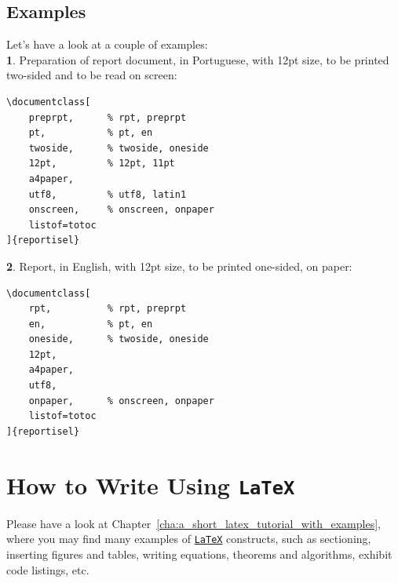 \subsection{Examples}
\label{ssec:examples}

Let's have a look at a couple of examples:\\

\textbf{1}. Preparation of report document, in Portuguese, with 12pt size, to be printed two-sided and to be read on screen:
\begin{lstlisting}[language=myLaTeX]
\documentclass[
    preprpt,      % rpt, preprpt
    pt,           % pt, en
    twoside,      % twoside, oneside
    12pt,         % 12pt, 11pt
    a4paper,
    utf8,         % utf8, latin1
    onscreen,     % onscreen, onpaper
    listof=totoc
]{reportisel}    
\end{lstlisting}


\textbf{2}. Report, in English, with 12pt size, to be printed one-sided, on paper:
\begin{lstlisting}[language=myLaTeX]
\documentclass[
    rpt,          % rpt, preprpt
    en,           % pt, en
    oneside,      % twoside, oneside
    12pt,
    a4paper,
    utf8,
    onpaper,      % onscreen, onpaper
    listof=totoc
]{reportisel}
\end{lstlisting}


\section{How to Write Using \texttt{LaTeX}}
\label{sec:how_to_write_using_latex}

Please have a look at Chapter~\ref{cha:a_short_latex_tutorial_with_examples}, where you may find many examples of \href{http://tobi.oetiker.ch/lshort/lshort.pdf}{\texttt{LaTeX}} constructs, such as sectioning, inserting figures and tables, writing equations, theorems and algorithms, exhibit code listings, etc.